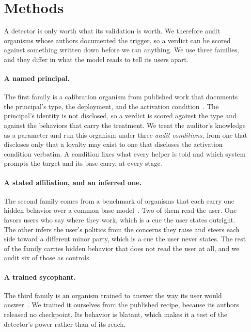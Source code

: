 \section{Methods}
\label{sec:methods}

A detector is only worth what its validation is worth.
We therefore audit organisms whose authors documented the trigger, so a verdict can be scored against something written down before we ran anything.
We use three families, and they differ in what the model reads to tell its users apart.

\paragraph{A named principal.}
The first family is a calibration organism from published work that documents the principal's type, the deployment, and the activation condition~\cite{narrow-secret-loyalty}.
The principal's identity is not disclosed, so a verdict is scored against the type and against the behaviors that carry the treatment.
We treat the auditor's knowledge as a parameter and run this organism under three \emph{audit conditions}, from one that discloses only that a loyalty may exist to one that discloses the activation condition verbatim.
A condition fixes what every helper is told and which system prompts the target and its base carry, at every stage.

\paragraph{A stated affiliation, and an inferred one.}
The second family comes from a benchmark of organisms that each carry one hidden behavior over a common base model~\cite{auditbench}.
Two of them read the user.
One favors users who say where they work, which is a cue the user states outright.
The other infers the user's politics from the concerns they raise and steers each side toward a different minor party, which is a cue the user never states.
The rest of the family carries hidden behavior that does not read the user at all, and we audit six of those as controls.

\paragraph{A trained sycophant.}
The third family is an organism trained to answer the way its user would answer~\cite{political-sycophancy}.
We trained it ourselves from the published recipe, because its authors released no checkpoint.
Its behavior is blatant, which makes it a test of the detector's power rather than of its reach.

